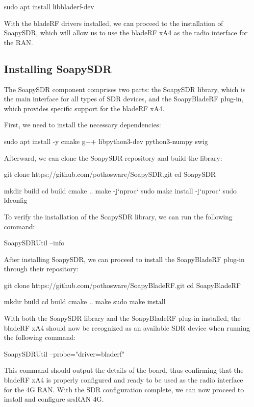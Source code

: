 \begin{code}
sudo apt install libbladerf-dev
\end{code}
With the bladeRF drivers installed, we can proceed to the installation of SoapySDR, which will allow us to use the bladeRF xA4 as the radio interface for the \gls{RAN}.

\subsection{Installing SoapySDR}
\label{sec:SoapySDR}

The SoapySDR component comprises two parts: the SoapySDR library, which is the main interface for all types of \gls{SDR} devices, and the SoapyBladeRF plug-in, which provides specific support for the bladeRF xA4.

First, we need to install the necessary dependencies:
\begin{code}
sudo apt install -y cmake g++ libpython3-dev python3-numpy swig
\end{code}
Afterward, we can clone the SoapySDR repository and build the library:
\begin{code}
git clone https://github.com/pothosware/SoapySDR.git
cd SoapySDR

mkdir build
cd build
cmake ..
make -j`nproc`
sudo make install -j`nproc`
sudo ldconfig
\end{code}
To verify the installation of the SoapySDR library, we can run the following command:
\begin{code}
SoapySDRUtil --info
\end{code}
After installing SoapySDR, we can proceed to install the SoapyBladeRF plug-in through their repository:
\begin{code}
git clone https://github.com/pothosware/SoapyBladeRF.git
cd SoapyBladeRF

mkdir build
cd build
cmake ..
make
sudo make install
\end{code}
With both the SoapySDR library and the SoapyBladeRF plug-in installed, the bladeRF xA4 should now be recognized as an available \gls{SDR} device when running the following command:
\begin{code}
SoapySDRUtil --probe="driver=bladerf"
\end{code}
This command should output the details of the board, thus confirming that the bladeRF xA4 is properly configured and ready to be used as the radio interface for the 4G \gls{RAN}. With the \gls{SDR} configuration complete, we can now proceed to install and configure srsRAN 4G.

